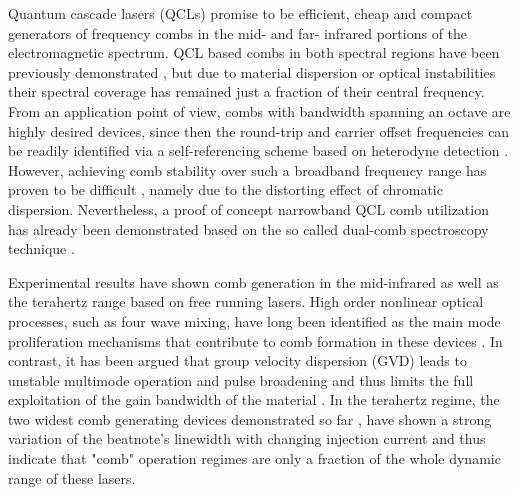 \documentclass[10pt,letterpaper]{article}
\begin{document}
Quantum cascade lasers (QCLs)  promise to be efficient, cheap and compact generators of frequency combs in the mid- and far- infrared portions of the electromagnetic spectrum. QCL based combs in both spectral regions have been previously demonstrated \cite{wienold2014evidence,burghoff2014terahertz,hugi2012mid}, but due to material dispersion or optical instabilities their spectral coverage has remained just a fraction of their central frequency. From an application point of view, combs with bandwidth spanning an octave are highly desired devices, since then the round-trip and carrier offset frequencies can be readily identified via a self-referencing scheme based on heterodyne detection \cite{ye2005femtosecond}. However, achieving comb stability over such a broadband frequency range has proven to be difficult \cite{rosch2015octave}, namely due to the distorting effect of chromatic dispersion. Nevertheless, a proof of concept narrowband QCL comb utilization has already been demonstrated based on the so called dual-comb spectroscopy technique \cite{villares2014dual}.

Experimental results have shown comb generation in the mid-infrared \cite{hugi2012mid} as well as the terahertz \cite{wienold2014evidence,burghoff2014terahertz,rosch2015octave} range based on free running lasers. High order nonlinear optical processes, such as four wave mixing, have long been identified as the main mode proliferation mechanisms that contribute to comb formation in these devices \cite{friedli2013four,khurgin2014coherent}. In contrast, it has been argued that group velocity dispersion (GVD) leads to unstable multimode operation and pulse broadening and thus limits the full exploitation of the gain bandwidth of the material \cite{villares2015quantum}. In the terahertz regime, the two widest comb generating devices demonstrated so far \cite{burghoff2014terahertz,rosch2015octave}, have shown a strong variation of the beatnote's linewidth with changing injection current and thus indicate that "comb"  operation regimes are only a fraction of the whole dynamic range of these lasers. 
\end{document}
